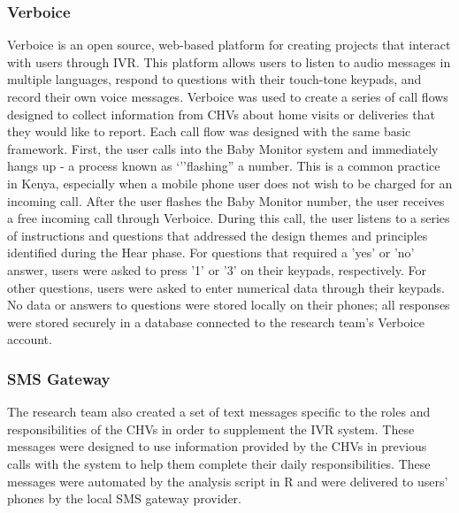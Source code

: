 \subsubsection{Verboice}

Verboice is an open source, web-based platform for creating projects that interact with users through IVR. This platform allows users to listen to audio messages in multiple languages, respond to questions with their touch-tone keypads, and record their own voice messages. Verboice was used to create a series of call flows designed to collect information from CHVs about home visits or deliveries that they would like to report. Each call flow was designed with the same basic framework. First, the user calls into the Baby Monitor system and immediately hangs up - a process known as `''flashing'' a number. This is a common practice in Kenya, especially when a mobile phone user does not wish to be charged for an incoming call. After the user flashes the Baby Monitor number, the user receives a free incoming call through Verboice. During this call, the user listens to a series of instructions and questions that addressed the design themes and principles identified during the Hear phase. For questions that required a 'yes' or 'no' answer, users were asked to press '1' or '3' on their keypads, respectively. For other questions, users were asked to enter numerical data through their keypads. No data or answers to questions were stored locally on their phones; all responses were stored securely in a database connected to the research team's Verboice account. 

\subsubsection{SMS Gateway}
The research team also created a set of text messages specific to the roles and responsibilities of the CHVs in order to supplement the IVR system. These messages were designed to use information provided by the CHVs in previous calls with the system to help them complete their daily responsibilities. These messages were automated by the analysis script in R and were delivered to users' phones by the local SMS gateway provider. 

